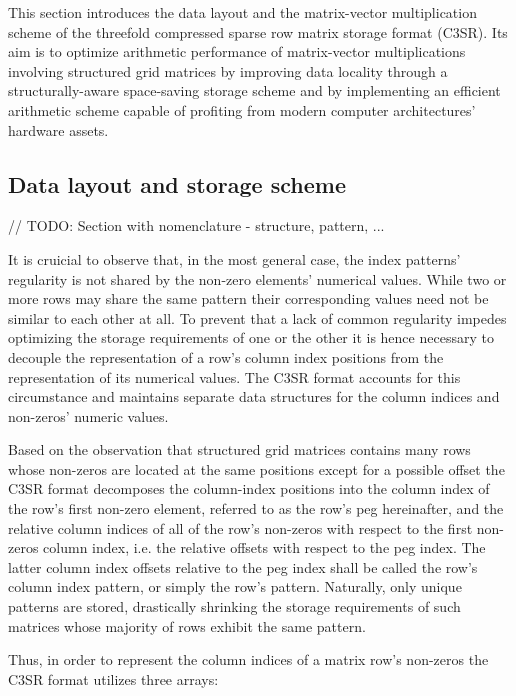\documentclass{article}
\begin{document}
  This section introduces the data layout and the matrix-vector multiplication scheme of the threefold compressed sparse row matrix storage format (C3SR). Its aim is to optimize arithmetic performance of matrix-vector multiplications involving structured grid matrices by improving data locality through a structurally-aware space-saving storage scheme and by implementing an efficient arithmetic scheme capable of profiting from modern computer architectures' hardware assets.

  \subsection{Data layout and storage scheme}

    // TODO: Section with nomenclature - structure, pattern, ...

    It is cruicial to observe that, in the most general case, the index patterns' regularity is not shared by the non-zero elements' numerical values. While two or more rows may share the same pattern their corresponding values need not be similar to each other at all. To prevent that a lack of common regularity impedes optimizing the storage requirements of one or the other it is hence necessary to decouple the representation of a row's column index positions from the representation of its numerical values. The C3SR format accounts for this circumstance and maintains separate data structures for the column indices and non-zeros' numeric values.

    Based on the observation that structured grid matrices contains many rows whose non-zeros are located at the same positions except for a possible offset the C3SR format decomposes the column-index positions into the column index of the row's first non-zero element, referred to as the row's peg hereinafter, and the relative column indices of all of the row's non-zeros with respect to the first non-zeros column index, i.e. the relative offsets with respect to the peg index. The latter column index offsets relative to the peg index shall be called the row's column index pattern, or simply the row's pattern. Naturally, only unique patterns are stored, drastically shrinking the storage requirements of such matrices whose majority of rows exhibit the same pattern.

    Thus, in order to represent the column indices of a matrix row's non-zeros the C3SR format utilizes three arrays:
\end{document}
